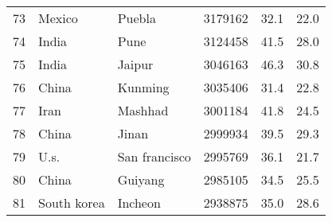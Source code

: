 \begin{center}
\begin{longtable}{clllcc}
        73                                       & Mexico                               & Puebla                            & 3179162                                 & 32.1                                  & 22.0                                  \\
        74                                       & India                                & Pune                              & 3124458                                 & 41.5                                  & 28.0                                  \\
        75                                       & India                                & Jaipur                            & 3046163                                 & 46.3                                  & 30.8                                  \\
        76                                       & China                                & Kunming                           & 3035406                                 & 31.4                                  & 22.8                                  \\
        77                                       & Iran                                 & Mashhad                           & 3001184                                 & 41.8                                  & 24.5                                  \\
        78                                       & China                                & Jinan                             & 2999934                                 & 39.5                                  & 29.3                                  \\
        79                                       & U.s.                                 & San francisco                     & 2995769                                 & 36.1                                  & 21.7                                  \\
        80                                       & China                                & Guiyang                           & 2985105                                 & 34.5                                  & 25.5                                  \\
        81                                       & South korea                          & Incheon                           & 2938875                                 & 35.0                                  & 28.6                                  \\

\end{longtable}
\end{center}
